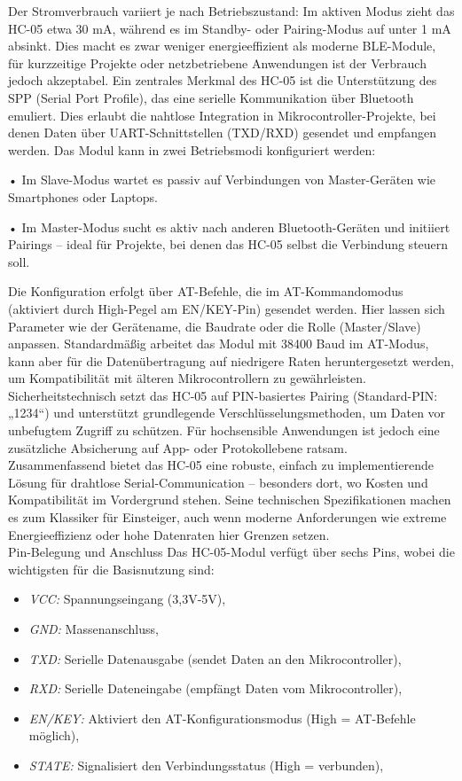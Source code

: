 Der Stromverbrauch variiert je nach Betriebszustand: Im aktiven Modus zieht das HC-05 etwa 30 mA, während es im Standby- oder Pairing-Modus auf unter 1 mA absinkt. Dies macht es zwar weniger energieeffizient als moderne BLE-Module, für kurzzeitige Projekte oder netzbetriebene Anwendungen ist der Verbrauch jedoch akzeptabel.
Ein zentrales Merkmal des HC-05 ist die Unterstützung des SPP (Serial Port Profile), das eine serielle Kommunikation über Bluetooth emuliert. Dies erlaubt die nahtlose Integration in Mikrocontroller-Projekte, bei denen Daten über UART-Schnittstellen (TXD/RXD) gesendet und empfangen werden. Das Modul kann in zwei Betriebsmodi konfiguriert werden:


•	Im Slave-Modus wartet es passiv auf Verbindungen von Master-Geräten wie Smartphones oder Laptops.

•	Im Master-Modus sucht es aktiv nach anderen Bluetooth-Geräten und initiiert Pairings – ideal für Projekte, bei denen das HC-05 selbst die Verbindung steuern soll.


Die Konfiguration erfolgt über AT-Befehle, die im AT-Kommandomodus (aktiviert durch High-Pegel am EN/KEY-Pin) gesendet werden. Hier lassen sich Parameter wie der Gerätename, die Baudrate oder die Rolle (Master/Slave) anpassen. Standardmäßig arbeitet das Modul mit 38400 Baud im AT-Modus, kann aber für die Datenübertragung auf niedrigere Raten heruntergesetzt werden, um Kompatibilität mit älteren Mikrocontrollern zu gewährleisten.
Sicherheitstechnisch setzt das HC-05 auf PIN-basiertes Pairing (Standard-PIN: „1234“) und unterstützt grundlegende Verschlüsselungsmethoden, um Daten vor unbefugtem Zugriff zu schützen. Für hochsensible Anwendungen ist jedoch eine zusätzliche Absicherung auf App- oder Protokollebene ratsam.\\


Zusammenfassend bietet das HC-05 eine robuste, einfach zu implementierende Lösung für drahtlose Serial-Communication – besonders dort, wo Kosten und Kompatibilität im Vordergrund stehen. Seine technischen Spezifikationen machen es zum Klassiker für Einsteiger, auch wenn moderne Anforderungen wie extreme Energieeffizienz oder hohe Datenraten hier Grenzen setzen.\\

Pin-Belegung und Anschluss
Das HC-05-Modul verfügt über sechs Pins, wobei die wichtigsten für die Basisnutzung sind:

\begin{itemize}
	\item\textit{VCC:} Spannungseingang (3,3V-5V),
	\item\textit{GND:} Massenanschluss,
	\item\textit{TXD:} Serielle Datenausgabe (sendet Daten an den Mikrocontroller),
	\item\textit{RXD:} Serielle Dateneingabe (empfängt Daten vom Mikrocontroller),
	\item\textit{EN/KEY:} Aktiviert den AT-Konfigurationsmodus (High = AT-Befehle möglich),
	\item\textit{STATE:} Signalisiert den Verbindungsstatus (High = verbunden),
\end{itemize}

